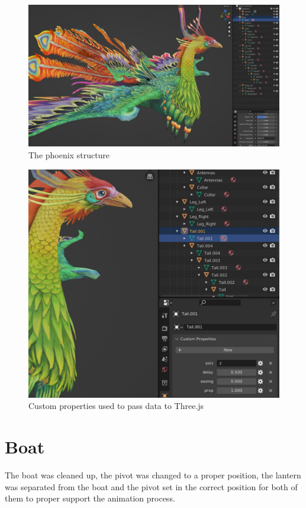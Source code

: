 \documentclass[10pt,a4paper]{article}
\begin{document}
\begin{figure}[H]
   \caption{The phoenix structure}
  \includegraphics[width=1\textwidth]{phoenix}
\end{figure}

\begin{figure}[H]
\caption{Custom properties used to pass data to Three.js}
\includegraphics[width=1\textwidth]{phoenix_data}
\end{figure}

\section{Boat}

The boat was cleaned up, the pivot was changed to a proper position, the lantern was separated from the boat and the pivot set in the correct position for both of them to proper support the animation process.
\end{document}
